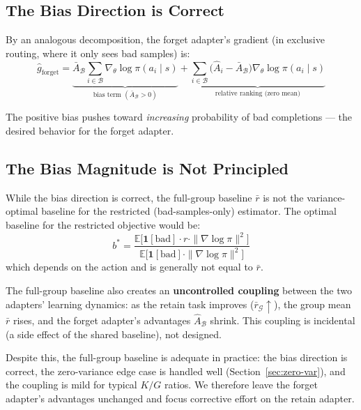 \documentclass[11pt]{article}
\begin{document}
\subsection{The Bias Direction is Correct}

By an analogous decomposition, the forget adapter's gradient (in exclusive
routing, where it only sees bad samples) is:
\begin{equation}
    \hat{g}_{\text{forget}}
    = \underbrace{\bar{A}_{\mathcal{B}}
        \sum_{i \in \mathcal{B}} \nabla_\theta \log \pi(a_i \mid s)
    }_{\text{bias term } (\bar{A}_{\mathcal{B}} > 0)}
    + \underbrace{\sum_{i \in \mathcal{B}}
        \bigl(\hat{A}_i - \bar{A}_{\mathcal{B}}\bigr)
        \nabla_\theta \log \pi(a_i \mid s)
    }_{\text{relative ranking (zero mean)}}
\end{equation}

The positive bias pushes toward \emph{increasing} probability of bad
completions --- the desired behavior for the forget adapter.

\subsection{The Bias Magnitude is Not Principled}

While the bias direction is correct, the full-group baseline $\bar{r}$ is not the
variance-optimal baseline for the restricted (bad-samples-only) estimator. The
optimal baseline for the restricted objective would be:
\begin{equation}
    b^* = \frac{\mathbb{E}\bigl[\mathbf{1}[\text{bad}] \cdot r
        \cdot \|\nabla \log \pi\|^2\bigr]}
    {\mathbb{E}\bigl[\mathbf{1}[\text{bad}]
        \cdot \|\nabla \log \pi\|^2\bigr]}
\end{equation}
which depends on the action and is generally not equal to $\bar{r}$.

The full-group baseline also creates an \textbf{uncontrolled coupling} between
the two adapters' learning dynamics: as the retain task improves
($\bar{r}_{\mathcal{G}} \uparrow$), the group mean $\bar{r}$ rises, and the
forget adapter's advantages $\hat{A}_{\mathcal{B}}$ shrink. This coupling is
incidental (a side effect of the shared baseline), not designed.

Despite this, the full-group baseline is adequate in practice:
the bias direction is correct, the zero-variance edge case is handled well
(Section~\ref{sec:zero-var}), and the coupling is mild for typical $K/G$ ratios.
We therefore leave the forget adapter's advantages unchanged and focus corrective
effort on the retain adapter.
\end{document}

